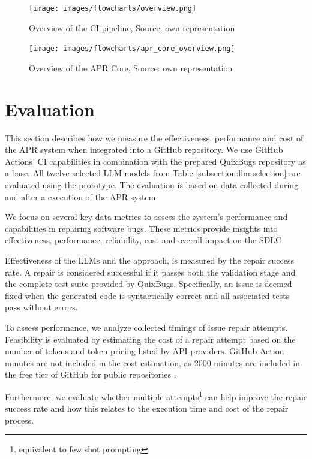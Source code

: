 \begin{figure}[H]
    \centering
    \texttt{[image: images/flowcharts/overview.png]}
    \caption{Overview of the CI pipeline, Source: own representation}
    \label{fig:high-level}
\end{figure}

\begin{figure}[H]
    \centering
    \texttt{[image: images/flowcharts/apr\_core\_overview.png]}
    \caption{Overview of the APR Core, Source: own representation}
    \label{fig:apr-core-overview}
\end{figure}



\section{Evaluation} \label{section:evaluation}
This section describes how we measure the effectiveness, performance and cost of the APR system when integrated into a GitHub repository. We use GitHub Actions' \ac{CI} capabilities in combination with the prepared QuixBugs repository as a base. All twelve selected LLM models from Table \ref{subsection:llm-selection} are evaluated using the prototype. The evaluation is based on data collected during and after a execution of the APR system.

We focus on several key data metrics to assess the system's performance and capabilities in repairing software bugs. These metrics provide insights into effectiveness, performance, reliability, cost and overall impact on the \ac{SDLC}.

Effectiveness of the \acp{LLM} and the approach, is measured by the repair success rate. A repair is considered successful if it passes both the validation stage and the complete test suite provided by QuixBugs. Specifically, an issue is deemed fixed when the generated code is syntactically correct and all associated tests pass without errors.

To assess performance, we analyze collected timings of issue repair attempts. Feasibility is evaluated by estimating the cost of a repair attempt based on the number of tokens and token pricing listed by \ac{API} providers. GitHub Action minutes are not included in the cost estimation, as 2000 minutes are included in the free tier of GitHub for public repositories \cite{GitHubsPlans}.

Furthermore, we evaluate whether multiple attempts\footnote{equivalent to few shot prompting} can help improve the repair success rate and how this relates to the execution time and cost of the repair process.

